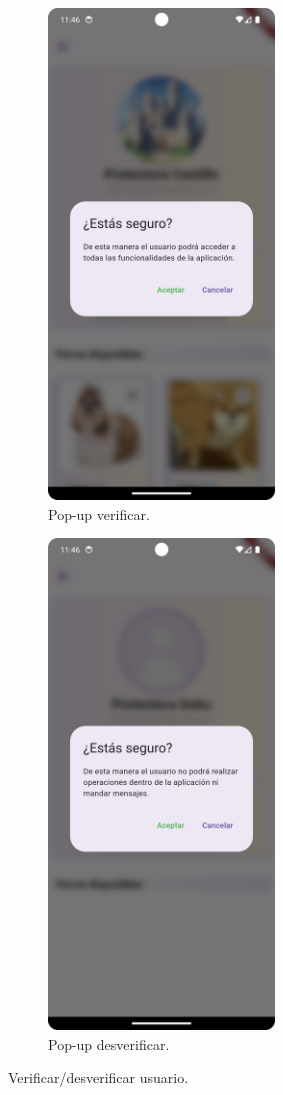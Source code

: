\documentclass[a4paper, 12pt]{article}
\begin{document}
\begin{figure}[H]
   	\begin{subfigure}{0.48\textwidth}
		\begin{center}
			{\includegraphics[width=6cm]{app/AdminVerifyPopUp}\par}
			\caption{Pop-up verificar.}
		\end{center}
	\end{subfigure}\hfill
   	\begin{subfigure}{0.48\textwidth}
		\begin{center}
			{\includegraphics[width=6cm]{app/AdminUnVerifyPopUp}\par}
			\caption{Pop-up desverificar.}
		\end{center}
	\end{subfigure}\hfill
	\caption{Verificar/desverificar usuario.}
\end{figure}
\end{document}
